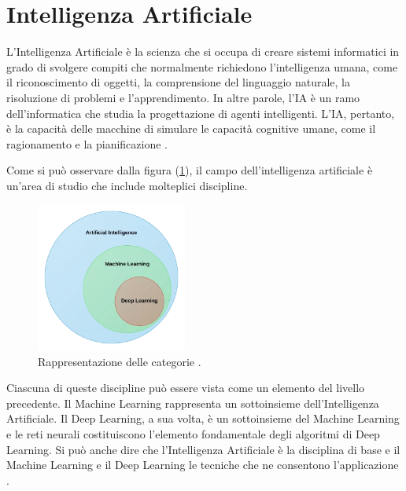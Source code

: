 
\section{Intelligenza Artificiale}
L'Intelligenza Artificiale è la scienza che si occupa di creare sistemi informatici 
in grado di svolgere compiti che normalmente richiedono l’intelligenza umana, 
come il riconoscimento di oggetti, la comprensione del linguaggio naturale, la 
risoluzione di problemi e l’apprendimento.
In altre parole, l’IA è un ramo dell’informatica che studia la progettazione di 
agenti intelligenti.
L’IA, pertanto, è la capacità delle macchine di simulare le capacità 
cognitive umane, come il ragionamento e la pianificazione \cite{IA_1,IA_EM_SH, IA_ML_DL}.


Come si può osservare dalla figura (\ref{fig:rappresentazione dell'IA, ML e DL}), 
il campo dell'intelligenza artificiale è un'area di studio che include molteplici 
discipline.

\begin{figure}[H]
    \centering
    \includegraphics[width=0.44\textwidth]{Immagini/Generiche/AI_ML_DL_Differenze_v2.png}
    \caption{Rappresentazione delle categorie \cite{INGLOBAZIONE_IA}.} 
    \label{fig:rappresentazione dell'IA, ML e DL}
\end{figure}
Ciascuna di queste discipline può essere vista come un elemento del livello precedente.
Il Machine Learning rappresenta un sottoinsieme dell’Intelligenza Artificiale. 
Il Deep Learning, a sua volta, è un sottoinsieme del Machine Learning e le 
reti neurali costituiscono l'elemento fondamentale degli 
algoritmi di Deep Learning.
Si può anche dire che l'Intelligenza Artificiale è la disciplina di base e il Machine 
Learning e il Deep Learning le tecniche che ne consentono 
l’applicazione \cite{IA_1,IA_ML_DL}. 



